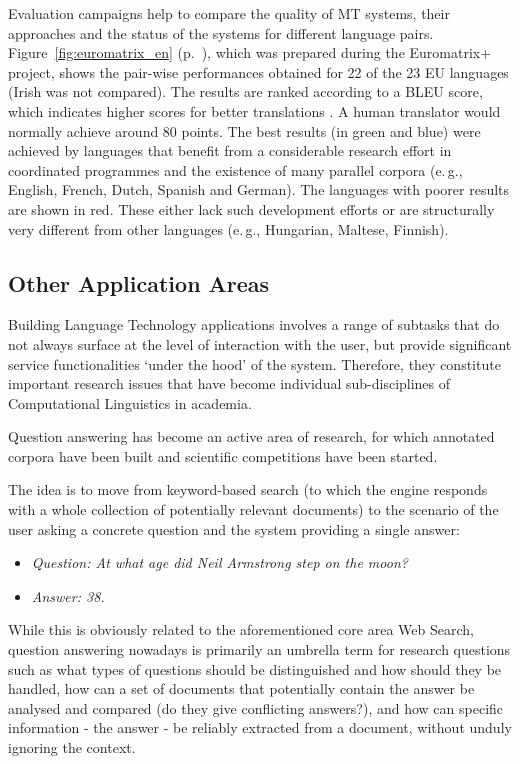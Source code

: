 \begin{multicols}{2}
\begin{itemize}
\begin{multicols}{2}
Evaluation campaigns help to compare the quality of MT systems, their approaches and the status of the systems for different language pairs. Figure~\ref{fig:euromatrix_en} (p.~\pageref{fig:euromatrix_en}), which was prepared during the Euromatrix+ project, shows the pair-wise performances obtained for 22 of the 23 EU languages (Irish was not compared). The results are ranked according to a BLEU score, which indicates higher scores for better translations \cite{bleu1}. A human translator would normally achieve around 80 points. The best results (in green and blue) were achieved by languages that benefit from a considerable research effort in coordinated programmes and the existence of many parallel corpora (e.\,g., English, French, Dutch, Spanish and German). The languages with poorer results are shown in red. These either lack such development efforts or are structurally very different from other languages (e.\,g., Hungarian, Maltese, Finnish).

\subsection{Other Application Areas}

Building Language Technology applications involves a range of subtasks that do not always surface at the level of interaction with the user, but provide significant service functionalities ‘under the hood’ of the system. Therefore, they constitute important research issues that have become individual sub-disciplines of Computational Linguistics in academia. 

Question answering has become an active area of research, for which annotated corpora have been built and scientific competitions have been started.

The idea is to move from keyword-based search (to which the engine responds with a whole collection of potentially relevant documents) to the scenario of the user asking a concrete question and the system providing a single answer: \\
\begin{itemize}
\item[] \textit{Question: At what age did Neil Armstrong step on the moon?}
\item[] \textit{Answer: 38.}
\end{itemize}

While this is obviously related to the aforementioned core area Web Search, question answering nowadays is primarily an umbrella term for research questions such as what types of questions should be distinguished and how should they be handled, how can a set of documents that potentially contain the answer be analysed and compared (do they give conflicting answers?), and how can specific information - the answer - be reliably extracted from a document, without unduly ignoring the context. 


\end{multicols}
\end{itemize}
\end{multicols}
